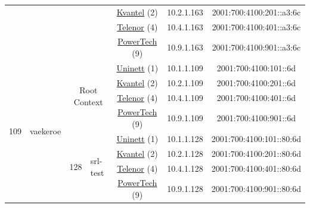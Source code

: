 \begin{small}
\begin{center}
\begin{longtable}{|c|c|c|c|c|c|c|c|}
  &  &  &  & \multicolumn{2}{|c|}{\tiny{\href{http://kvantel.no}{Kvantel} (2)}} & \tiny{10.2.1.163} & \tiny{2001:700:4100:201::a3:6c} \\* \cline{5-5}\cline{6-6}\cline{7-7}\cline{8-8}
  &  &  &  & \multicolumn{2}{|c|}{\tiny{\href{https://www.telenor.no}{Telenor} (4)}} & \tiny{10.4.1.163} & \tiny{2001:700:4100:401::a3:6c} \\* \cline{5-5}\cline{6-6}\cline{7-7}\cline{8-8}
  &  &  &  & \multicolumn{2}{|c|}{\tiny{\href{http://www.powertech.no}{PowerTech} (9)}} & \tiny{10.9.1.163} & \tiny{2001:700:4100:901::a3:6c} \\ \hline
 \multirow{28}{*}{\tiny{109}} & \multicolumn{1}{|l|}{\multirow{28}{*}{\tiny{vaekeroe}}} & \multicolumn{2}{|c|}{\multirow{4}{*}{\tiny{Root Context}}} & \multicolumn{2}{|c|}{\tiny{\href{https://www.uninett.no}{Uninett} (1)}} & \tiny{10.1.1.109} & \tiny{2001:700:4100:101::6d} \\* \cline{5-5}\cline{6-6}\cline{7-7}\cline{8-8}
  &  & \multicolumn{2}{|c|}{} & \multicolumn{2}{|c|}{\tiny{\href{http://kvantel.no}{Kvantel} (2)}} & \tiny{10.2.1.109} & \tiny{2001:700:4100:201::6d} \\* \cline{5-5}\cline{6-6}\cline{7-7}\cline{8-8}
  &  & \multicolumn{2}{|c|}{} & \multicolumn{2}{|c|}{\tiny{\href{https://www.telenor.no}{Telenor} (4)}} & \tiny{10.4.1.109} & \tiny{2001:700:4100:401::6d} \\* \cline{5-5}\cline{6-6}\cline{7-7}\cline{8-8}
  &  & \multicolumn{2}{|c|}{} & \multicolumn{2}{|c|}{\tiny{\href{http://www.powertech.no}{PowerTech} (9)}} & \tiny{10.9.1.109} & \tiny{2001:700:4100:901::6d} \\* \cline{3-3}\cline{4-4}\cline{5-5}\cline{6-6}\cline{7-7}\cline{8-8}
  &  & \multirow{4}{*}{\tiny{128}} & \multicolumn{1}{|l|}{\multirow{4}{*}{\tiny{srl-test}}} & \multicolumn{2}{|c|}{\tiny{\href{https://www.uninett.no}{Uninett} (1)}} & \tiny{10.1.1.128} & \tiny{2001:700:4100:101::80:6d} \\* \cline{5-5}\cline{6-6}\cline{7-7}\cline{8-8}
  &  &  &  & \multicolumn{2}{|c|}{\tiny{\href{http://kvantel.no}{Kvantel} (2)}} & \tiny{10.2.1.128} & \tiny{2001:700:4100:201::80:6d} \\* \cline{5-5}\cline{6-6}\cline{7-7}\cline{8-8}
  &  &  &  & \multicolumn{2}{|c|}{\tiny{\href{https://www.telenor.no}{Telenor} (4)}} & \tiny{10.4.1.128} & \tiny{2001:700:4100:401::80:6d} \\* \cline{5-5}\cline{6-6}\cline{7-7}\cline{8-8}
  &  &  &  & \multicolumn{2}{|c|}{\tiny{\href{http://www.powertech.no}{PowerTech} (9)}} & \tiny{10.9.1.128} & \tiny{2001:700:4100:901::80:6d} \\* \cline{3-3}\cline{4-4}\cline{5-5}\cline{6-6}\cline{7-7}\cline{8-8}

\end{longtable}
\end{center}
\end{small}
